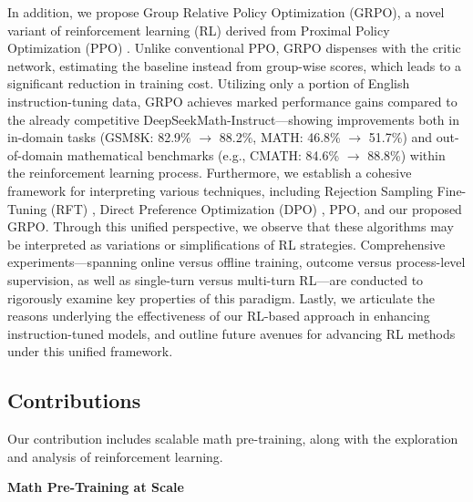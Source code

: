 In addition, we propose Group Relative Policy Optimization (GRPO), a novel variant of reinforcement learning (RL) derived from Proximal Policy Optimization (PPO) \citep{schulman2017proximal}. Unlike conventional PPO, GRPO dispenses with the critic network, estimating the baseline instead from group-wise scores, which leads to a significant reduction in training cost. Utilizing only a portion of English instruction-tuning data, GRPO achieves marked performance gains compared to the already competitive DeepSeekMath-Instruct—showing improvements both in in-domain tasks (GSM8K: 82.9\% $\rightarrow$ 88.2\%, MATH: 46.8\% $\rightarrow$ 51.7\%) and out-of-domain mathematical benchmarks (e.g., CMATH: 84.6\% $\rightarrow$ 88.8\%) within the reinforcement learning process. Furthermore, we establish a cohesive framework for interpreting various techniques, including Rejection Sampling Fine-Tuning (RFT) \citep{yuan2023scaling}, Direct Preference Optimization (DPO) \citep{dpo}, PPO, and our proposed GRPO. Through this unified perspective, we observe that these algorithms may be interpreted as variations or simplifications of RL strategies. Comprehensive experiments—spanning online versus offline training, outcome versus process-level supervision, as well as single-turn versus multi-turn RL—are conducted to rigorously examine key properties of this paradigm. Lastly, we articulate the reasons underlying the effectiveness of our RL-based approach in enhancing instruction-tuned models, and outline future avenues for advancing RL methods under this unified framework.

\subsection{Contributions}
Our contribution includes scalable math pre-training, along with the exploration and analysis of reinforcement learning.

\textbf{Math Pre-Training at Scale}

